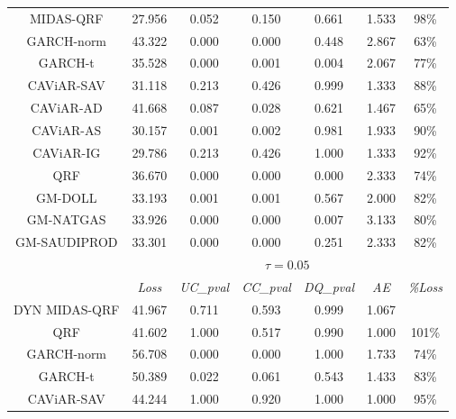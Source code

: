 \begin{table}[H]
\begin{tabular}{ccccccc}
\rowcolor[HTML]{D9D9D9} 
MIDAS-QRF                             & 27.956 & 0.052    & 0.150    & 0.661    & 1.533 & 98\%   \\
GARCH-norm                      & 43.322 & 0.000    & 0.000    & 0.448    & 2.867 & 63\%   \\
GARCH-t                         & 35.528 & 0.000    & 0.001    & 0.004    & 2.067 & 77\%   \\
\rowcolor[HTML]{D9D9D9} 
CAViAR-SAV                      & 31.118 & 0.213    & 0.426    & 0.999    & 1.333 & 88\%   \\
\rowcolor[HTML]{D9D9D9} CAViAR-AD                       & 41.668 & 0.087    & 0.028    & 0.621    & 1.467 & 65\%   \\
CAViAR-AS                       & 30.157 & 0.001    & 0.002    & 0.981    & 1.933 & 90\%   \\
\rowcolor[HTML]{D9D9D9} 
CAViAR-IG                       & 29.786 & 0.213    & 0.426    & 1.000    & 1.333 & 92\%   \\
QRF                             & 36.670 & 0.000    & 0.000    & 0.000    & 2.333 & 74\%   \\
GM-DOLL                         & 33.193 & 0.001    & 0.001    & 0.567    & 2.000 & 82\%   \\
GM-NATGAS                       & 33.926 & 0.000    & 0.000    & 0.007    & 3.133 & 80\%   \\
GM-SAUDIPROD                   & 33.301 & 0.000    & 0.000    & 0.251    & 2.333 & 82\%   \\ \hline
                                & \multicolumn{6}{c}{$\tau=0.05$}                          \\ \hline
                                & \textit{Loss}   & \textit{UC\_pval} & \textit{CC\_pval} & \textit{DQ\_pval} & \textit{AE }   & \textit{\%Loss} \\ \hline
\rowcolor[HTML]{D9D9D9} 
DYN MIDAS-QRF                        & 41.967 & 0.711    & 0.593    & 0.999    & 1.067 &        \\
\rowcolor[HTML]{D9D9D9} 
QRF                             & 41.602 & 1.000    & 0.517    & 0.990    & 1.000 & 101\%  \\
GARCH-norm                      & 56.708 & 0.000    & 0.000    & 1.000    & 1.733 & 74\%   \\
\rowcolor[HTML]{D9D9D9} GARCH-t                         & 50.389 & 0.022    & 0.061    & 0.543    & 1.433 & 83\%   \\
\rowcolor[HTML]{D9D9D9} 
CAViAR-SAV                      & 44.244 & 1.000    & 0.920    & 1.000    & 1.000 & 95\%   \\

\end{tabular}
\end{table}
